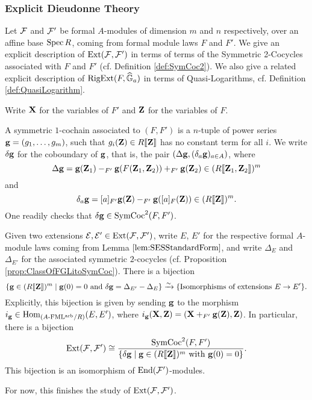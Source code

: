 \documentclass[../main.tex]{subfiles}
\begin{document}
\subsubsection{Explicit Dieudonne Theory} %
\label{ssub:Explicit Dieudonne Theory}
Let $\mathcal{F}$ and $\mathcal{F}'$ be formal $A$-modules of dimension $m$ and $n$ respectively,
over an affine base $\operatorname{Spec} R$, coming from formal module laws $F$ and $F'$. We
give an explicit description of $\operatorname{Ext}(\mathcal{F}, \mathcal{F}')$ in terms of terms of the
Symmetric 2-Cocycles associated with $F$ and $F'$ (cf. Definition
\ref{def:SymCoc2}). 
We also give a related explicit description of $\operatorname {RigExt}(F, \widehat{\mathbb{G}}_a)$ in terms of 
Quasi-Logarithms, cf. Definition \ref{def:QuasiLogarithm}. 

Write $\mathbf{X}$ for the variables of $F'$ and $\mathbf{Z}$ for the variables of $F$.
\begin{defi} \label{def:SymCoc1}
  A symmetric $1$-cochain associated to $(F,F')$ is a $n$-tuple of power 
  series $\mathbf{g} = (g_1, \dots, g_m)$, such that $g_i(\mathbf{Z}) \in R\llbracket \mathbf{Z} \rrbracket$
  has no constant term for all $i$. We write $\delta \mathbf{g}$ 
  for the coboundary of $\mathbf{g}$, that is, the pair $(\Delta \mathbf{g}, (\delta_a
  \mathbf{g})_{a \in A})$,
  where
  \begin{equation*}
    \Delta \mathbf{g} = \mathbf{g}(\mathbf{Z}_1) -_{F'} \mathbf{g}(F(\mathbf{Z}_1,\mathbf{Z}_2)) +_{F'} \mathbf{g}(\mathbf{Z}_2)
    \in (R\llbracket \mathbf{Z}_1, \mathbf{Z}_2 \rrbracket)^m
  \end{equation*}
  and 
  \begin{equation*}
    \delta_a \mathbf{g} = [a]_{F'} \mathbf{g}(\mathbf{Z}) -_{F'} \mathbf{g}([a]_F(\mathbf{Z})) \in (R \llbracket \mathbf{Z}
    \rrbracket)^m.
  \end{equation*}
  One readily checks that $\delta \mathbf{g} \in \operatorname{SymCoc}^2(F, F')$. 
\end{defi}

\begin{prop}\label{prop:ExtInTermsOfSymCoc}
  Given two extensions $\mathcal{E},\mathcal{E}' \in \operatorname{Ext}(\mathcal{F}, \mathcal{F}')$, write 
  $E$, $E'$ for the respective formal $A$-module laws coming from Lemma
  $\ref{lem:SESStandardForm}$, and write
  $\Delta_E$ and $\Delta_{E'}$ for the associated symmetric $2$-cocycles (cf.
  Proposition \ref{prop:ClassOfFGLitoSymCoc}). There is a bijection
  \begin{equation*}
    \{\mathbf{g} \in (R\llbracket \mathbf{Z} \rrbracket)^m \mid \mathbf{g}(0) = 0 \text{ and } \delta \mathbf{g} = \Delta_{E'} - \Delta_E\}
    \xrightarrow{\sim} \{\text{Isomorphisms of extensions } E \to E' \}.
  \end{equation*}
  Explicitly, this bijection is given by sending $\mathbf{g}$ to the morphism
  $i_{\mathbf{g}} \in \operatorname{Hom}_{{({A}\text-\mathrm{FML^{arb}}/{R})}}(E, E')$, where 
  $i_{\mathbf{g}} (\mathbf{X}, \mathbf{Z}) = (\mathbf{X} +_{F'} \mathbf{g}(\mathbf{Z}), \mathbf{Z})$. In particular, there is a bijection
  \begin{equation*}
    \operatorname{Ext}(\mathcal{F}, \mathcal{F}') \cong \frac{\operatorname{SymCoc}^2(F, F')}{\{\delta \mathbf{g} 
    \mid \mathbf{g} \in (R\llbracket \mathbf{Z} \rrbracket)^m \text{ with } \mathbf{g}(0) = 0\}}.
  \end{equation*}
  This bijection is an isomorphism of $\operatorname{End}(\mathcal{F}')$-modules.
\end{prop}
For now, this finishes the study of $\operatorname{Ext}(\mathcal{F}, \mathcal{F}')$. 
\end{document}
